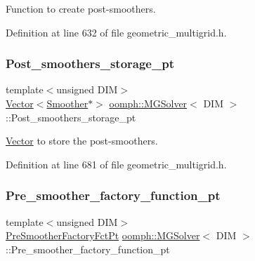 Function to create post-\/smoothers. 



Definition at line 632 of file geometric\+\_\+multigrid.\+h.

\mbox{\label{classoomph_1_1MGSolver_a2b5b5a2719782ab2f43b1aa9179c814c}} 
\subsubsection{\texorpdfstring{Post\+\_\+smoothers\+\_\+storage\+\_\+pt}{Post\_smoothers\_storage\_pt}}
{\footnotesize\ttfamily template$<$unsigned D\+IM$>$ \\
\hyperlink{classoomph_1_1Vector}{Vector}$<$\hyperlink{classoomph_1_1Smoother}{Smoother}$\ast$$>$ \hyperlink{classoomph_1_1MGSolver}{oomph\+::\+M\+G\+Solver}$<$ D\+IM $>$\+::Post\+\_\+smoothers\+\_\+storage\+\_\+pt\hspace{0.3cm}{\ttfamily [private]}}



\hyperlink{classoomph_1_1Vector}{Vector} to store the post-\/smoothers. 



Definition at line 681 of file geometric\+\_\+multigrid.\+h.

\mbox{\label{classoomph_1_1MGSolver_af7d8204d7b71b18f5362b01a971aad02}} 
\subsubsection{\texorpdfstring{Pre\+\_\+smoother\+\_\+factory\+\_\+function\+\_\+pt}{Pre\_smoother\_factory\_function\_pt}}
{\footnotesize\ttfamily template$<$unsigned D\+IM$>$ \\
\hyperlink{classoomph_1_1MGSolver_a43de5ad4985ae1bbe68388619a9db32a}{Pre\+Smoother\+Factory\+Fct\+Pt} \hyperlink{classoomph_1_1MGSolver}{oomph\+::\+M\+G\+Solver}$<$ D\+IM $>$\+::Pre\+\_\+smoother\+\_\+factory\+\_\+function\+\_\+pt\hspace{0.3cm}{\ttfamily [private]}}



